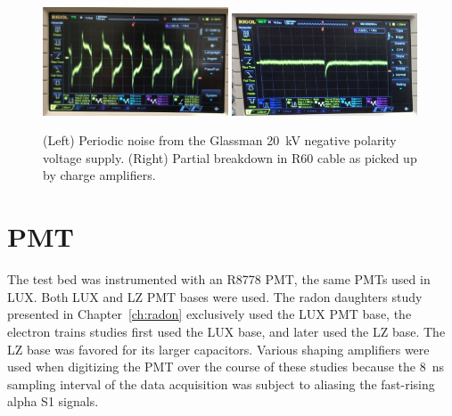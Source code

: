  \begin{figure}[htbp]
\begin{center}
\includegraphics[width = 0.49\textwidth, keepaspectratio]{figures/testbed/glassman_noise.png}
\includegraphics[width = 0.49\textwidth, keepaspectratio]{figures/testbed/partial_breakdown_pickup.png}
\caption{(Left) Periodic noise from the Glassman 20~kV negative polarity voltage supply. (Right) Partial breakdown in R60 cable as picked up by charge amplifiers.}
\label{fig:pickup_noise}
\end{center}
\end{figure}


\section{PMT}
The test bed was instrumented with an R8778 PMT, the same PMTs used in LUX. Both LUX and LZ PMT bases were used. The radon daughters study presented in Chapter~\ref{ch:radon} exclusively used the LUX PMT base, the electron trains studies first used the LUX base, and later used the LZ base. The LZ base was favored for its larger capacitors. Various shaping amplifiers were used when digitizing the PMT over the course of these studies because the 8~ns sampling interval of the data acquisition was subject to aliasing the fast-rising alpha S1 signals.


